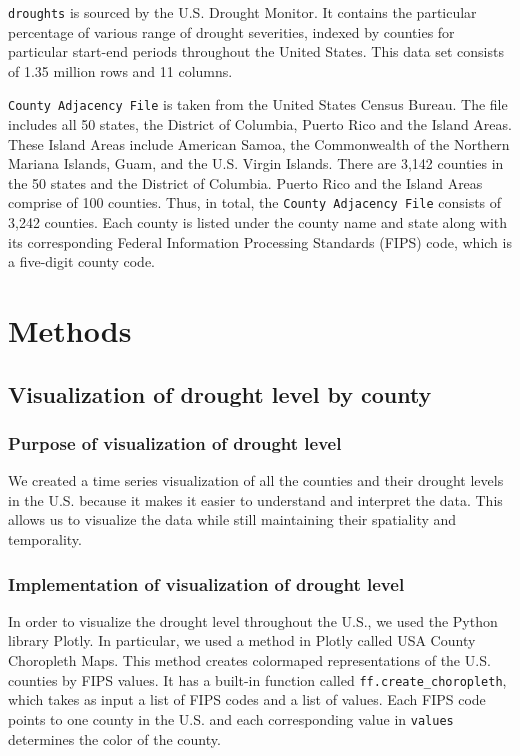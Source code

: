 \documentclass{article}
\begin{document}
\texttt{droughts} is sourced by the U.S. Drought Monitor. It contains the particular percentage of various range of drought severities, indexed by counties for particular start-end periods throughout the United States. This data set consists of 1.35 million rows and 11 columns.

\texttt{County Adjacency File} is taken from the United States Census Bureau. The file includes all 50 states, the District of Columbia, Puerto Rico and the Island Areas. These Island Areas include American Samoa, the Commonwealth of the Northern Mariana Islands, Guam, and the U.S. Virgin Islands. There are 3,142 counties in the 50 states and the District of Columbia. Puerto Rico and the Island Areas comprise of 100 counties.\cite{USCB:2018} Thus, in total, the \texttt{County Adjacency File} consists of 3,242 counties. Each county is listed under the county name and state along with its corresponding Federal Information Processing Standards (FIPS) code, which is a five-digit county code.

\section{Methods}
\subsection{Visualization of drought level by county}
\subsubsection{Purpose of visualization of drought level}
We created a time series visualization of all the counties and their drought levels in the U.S. because it makes it easier to understand and interpret the data. This allows us to visualize the data while still maintaining their spatiality and temporality.
\subsubsection{Implementation of visualization of drought level}
In order to visualize the drought level throughout the U.S., we used the Python library Plotly. In particular, we used a method in Plotly called USA County Choropleth Maps. This method creates colormaped representations of the U.S. counties by FIPS values. It has a built-in function called \texttt{ff.create\_choropleth}, which takes as input a list of FIPS codes and a list of values. Each FIPS code points to one county in the U.S. and each corresponding value in \texttt{values} determines the color of the county.\cite{plotly:2019}
\end{document}
